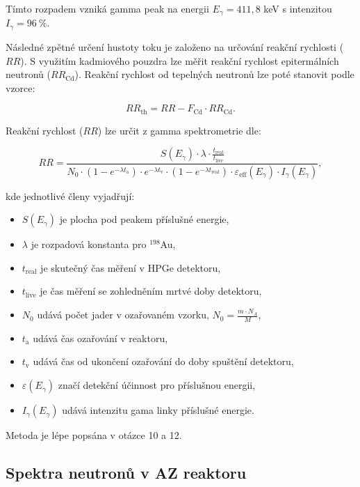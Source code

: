 Tímto rozpadem vzniká gamma peak na energii $E_\gamma = 411,8$ keV s intenzitou $I_\gamma = 96\ \%$.

Následné zpětné určení hustoty toku je založeno na určování reakční rychlosti ($RR$). S využitím kadmiového pouzdra lze měřit reakční rychlost epitermálních neutronů ($RR_\text{Cd}$). Reakční rychlost od tepelných neutronů lze poté stanovit podle vzorce:

\begin{equation*}
    RR_\text{th} = RR - F_\text{Cd} \cdot RR_\text{Cd}.
\end{equation*}

Reakční rychlost ($RR$) lze určit z gamma spektrometrie dle:

\begin{equation}
   RR = \frac{S(E_{\gamma})\cdot \lambda \cdot \frac{t_{\text{real}}}{t_{\text{live}}}}{N_0 \cdot (1-e^{-\lambda t_{\text{a}}}) \cdot e^{-\lambda t_{\text{v}}} \cdot (1-e^{-\lambda t_{\text{real}}}) \cdot \varepsilon_\text{eff}(E_{\gamma}) \cdot I_{\gamma}(E_{\gamma})},
\end{equation}

kde jednotlivé členy vyjadřují:

\begin{itemize}%
    \item  $S(E_{\gamma})$ je plocha pod peakem příslušné energie,
    \item  $\lambda$ je rozpadová konstanta pro $^{198}$Au,
    \item  $t_\text{real}$ je skutečný čas měření v HPGe detektoru, 
    \item  $t_\text{live}$ je čas měření se zohledněním mrtvé doby detektoru,
    \item  $N_0$ udává počet jader v ozařovaném vzorku, $N_0 = \frac{m \cdot N_A}{M}$,
    \item  $t_\text{a}$ udává čas ozařování v reaktoru,
    \item  $t_\text{v}$ udává čas od ukončení ozařování do doby spuštění detektoru,
    \item  $\varepsilon(E_{\gamma})$ značí detekční účinnost pro příslušnou energii,
    \item  $I_{\gamma}(E_{\gamma})$ udává intenzitu gama linky příslušné energie.
\end{itemize}

Metoda je lépe popsána v otázce 10 a 12.

\subsection{Spektra neutronů v AZ reaktoru}

